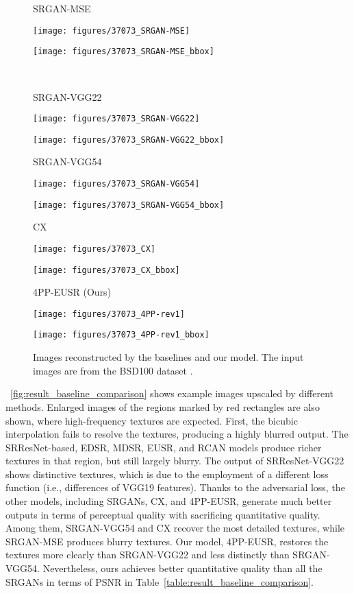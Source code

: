 \documentclass[runningheads]{llncs}
\begin{document}
\begin{figure*}[]
	\begin{minipage}[b]{0.24\linewidth}
		\centering
		\centerline{\scriptsize{SRGAN-MSE}}\medskip
		\centerline{\texttt{[image: figures/37073\_SRGAN-MSE]}}\smallskip
		\centerline{\texttt{[image: figures/37073\_SRGAN-MSE\_bbox]}}
	\end{minipage}
	\medskip \\ \medskip
	\begin{minipage}[b]{0.24\linewidth}
		\centering
		\centerline{\scriptsize{SRGAN-VGG22}}\medskip
		\centerline{\texttt{[image: figures/37073\_SRGAN-VGG22]}}\smallskip
		\centerline{\texttt{[image: figures/37073\_SRGAN-VGG22\_bbox]}}
	\end{minipage}
	\begin{minipage}[b]{0.24\linewidth}
		\centering
		\centerline{\scriptsize{SRGAN-VGG54}}\medskip
		\centerline{\texttt{[image: figures/37073\_SRGAN-VGG54]}}\smallskip
		\centerline{\texttt{[image: figures/37073\_SRGAN-VGG54\_bbox]}}
	\end{minipage}
	\begin{minipage}[b]{0.24\linewidth}
		\centering
		\centerline{\scriptsize{CX}}\medskip
		\centerline{\texttt{[image: figures/37073\_CX]}}\smallskip
		\centerline{\texttt{[image: figures/37073\_CX\_bbox]}}
	\end{minipage}
	\begin{minipage}[b]{0.24\linewidth}
		\centering
		\centerline{\scriptsize{4PP-EUSR (Ours)}}\medskip
		\centerline{\texttt{[image: figures/37073\_4PP-rev1]}}\smallskip
		\centerline{\texttt{[image: figures/37073\_4PP-rev1\_bbox]}}
	\end{minipage}
	\caption{Images reconstructed by the baselines and our model. The input images are from the BSD100 dataset \cite{martin2001database}.}
	\label{fig:result_baseline_comparison2}
\end{figure*}


\figurename~\ref{fig:result_baseline_comparison} shows example images upscaled by different methods.
Enlarged images of the regions marked by red rectangles are also shown, where high-frequency textures are expected. First, the bicubic interpolation fails to resolve the textures, producing a highly blurred output.
The SRResNet-based, EDSR, MDSR, EUSR, and RCAN models produce richer textures in that region, but still largely blurry.
The output of SRResNet-VGG22 shows distinctive textures, which is due to the employment of a different loss function (i.e., differences of VGG19 features).
Thanks to the adversarial loss, the other models, including SRGANs, CX, and 4PP-EUSR, generate much better outputs in terms of perceptual quality with sacrificing quantitative quality.
Among them, SRGAN-VGG54 and CX recover the most detailed textures, while SRGAN-MSE produces blurry textures.
Our model, 4PP-EUSR, restores the textures more clearly than SRGAN-VGG22 and less distinctly than SRGAN-VGG54.
Nevertheless, ours achieves better quantitative quality than all the SRGANs in terms of PSNR in Table~\ref{table:result_baseline_comparison}.
\end{document}

